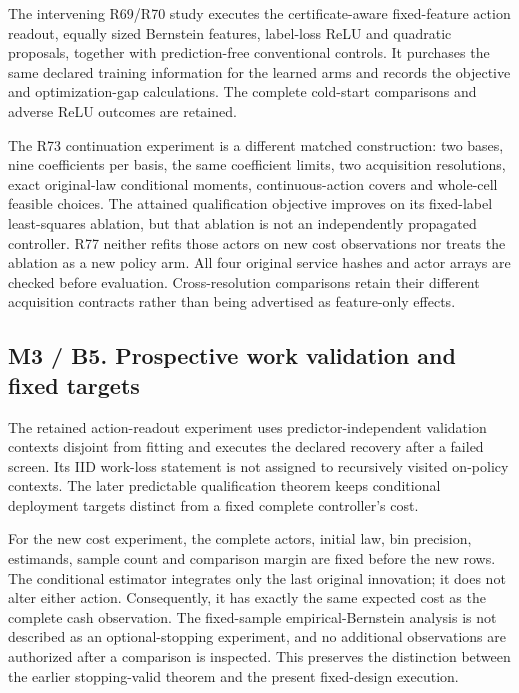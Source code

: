 \documentclass[ecta,nameyear,draft]{econsocart}
\begin{document}
The intervening R69/R70 study executes the certificate-aware
fixed-feature action readout, equally sized Bernstein features,
label-loss ReLU and quadratic proposals, together with prediction-free
conventional controls. It purchases the same declared training
information for the learned arms and records the objective and
optimization-gap calculations. The complete cold-start comparisons and
adverse ReLU outcomes are retained.

The R73 continuation experiment is a different matched construction: two
bases, nine coefficients per basis, the same coefficient limits, two
acquisition resolutions, exact original-law conditional moments,
continuous-action covers and whole-cell feasible choices. The attained
qualification objective improves on its fixed-label least-squares
ablation, but that ablation is not an independently propagated
controller. R77 neither refits those actors on new cost observations nor
treats the ablation as a new policy arm. All four original service
hashes and actor arrays are checked before evaluation. Cross-resolution
comparisons retain their different acquisition contracts rather than
being advertised as feature-only effects.

\hypertarget{m3-b5.-prospective-work-validation-and-fixed-targets}{%
\subsection{M3 / B5. Prospective work validation and fixed
targets}\label{m3-b5.-prospective-work-validation-and-fixed-targets}}

The retained action-readout experiment uses predictor-independent
validation contexts disjoint from fitting and executes the declared
recovery after a failed screen. Its IID work-loss statement is not
assigned to recursively visited on-policy contexts. The later
predictable qualification theorem keeps conditional deployment targets
distinct from a fixed complete controller's cost.

For the new cost experiment, the complete actors, initial law, bin
precision, estimands, sample count and comparison margin are fixed
before the new rows. The conditional estimator integrates only the last
original innovation; it does not alter either action. Consequently, it
has exactly the same expected cost as the complete cash observation. The
fixed-sample empirical-Bernstein analysis is not described as an
optional-stopping experiment, and no additional observations are
authorized after a comparison is inspected. This preserves the
distinction between the earlier stopping-valid theorem and the present
fixed-design execution.
\end{document}
